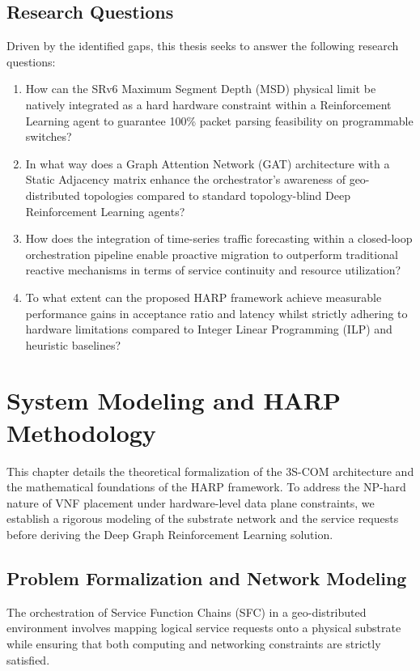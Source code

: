 \documentclass[12pt, a4paper, reqno, oneside]{book}
\begin{document}
\section{Research Questions}
\label{sec:rqs}
Driven by the identified gaps, this thesis seeks to answer the following research questions:

\begin{enumerate}[label=RQ\arabic*., leftmargin=*, nosep]
    \item How can the SRv6 Maximum Segment Depth (MSD) physical limit be natively integrated as a hard hardware constraint within a Reinforcement Learning agent to guarantee 100\% packet parsing feasibility on programmable switches?
    
    \item In what way does a Graph Attention Network (GAT) architecture with a Static Adjacency matrix enhance the orchestrator's awareness of geo-distributed topologies compared to standard topology-blind Deep Reinforcement Learning agents?
    
    \item How does the integration of time-series traffic forecasting within a closed-loop orchestration pipeline enable proactive migration to outperform traditional reactive mechanisms in terms of service continuity and resource utilization?
    
    \item To what extent can the proposed HARP framework achieve measurable performance gains in acceptance ratio and latency whilst strictly adhering to hardware limitations compared to Integer Linear Programming (ILP) and heuristic baselines?
\end{enumerate}


\chapter{System Modeling and HARP Methodology}
\label{chap:method}

This chapter details the theoretical formalization of the 3S-COM architecture and the mathematical foundations of the HARP framework. To address the NP-hard nature of VNF placement under hardware-level data plane constraints, we establish a rigorous modeling of the substrate network and the service requests before deriving the Deep Graph Reinforcement Learning solution.

\section{Problem Formalization and Network Modeling}
\label{sec:math_modeling}
The orchestration of Service Function Chains (SFC) in a geo-distributed environment involves mapping logical service requests onto a physical substrate while ensuring that both computing and networking constraints are strictly satisfied.
\end{document}
